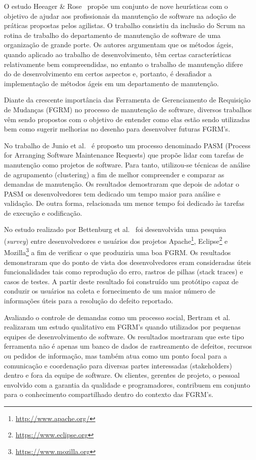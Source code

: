 O estudo Heeager \& Rose~\cite{Heeager2015} propõe um conjunto de nove heurísticas com o objetivo de ajudar aos profissionais da manutenção de software na adoção de práticas propostas pelos agilistas. O trabalho consistiu da inclusão do Scrum na rotina de trabalho do departamento de manutenção de software de uma organização de grande porte. Os autores argumentam que os métodos ágeis, quando aplicado ao trabalho de desenvolvimento, têm certas características relativamente bem compreendidas, no entanto o trabalho de manutenção difere do de desenvolvimento em certos aspectos e, portanto, é desafiador a implementação de métodos ágeis em um departamento de manutenção.

Diante da crescente importância das Ferramenta de Gerenciamento de Requisição de Mudanças (FGRM) no processo de manutenção de software, diversos trabalhos vêm sendo propostos com o objetivo de entender como elas estão sendo utilizadas bem como sugerir melhorias no desenho para desenvolver futuras FGRM's.

No trabalho de Junio et al.~\cite{5741246} é proposto um processo denominado PASM (Process for Arranging
Software Maintenance Requests) que propõe lidar com tarefas de manutenção como projetos de software. Para tanto, utilizou-se técnicas de análise de agrupamento (clustering) a fim de melhor compreender e comparar as demandas de manutenção. Os resultados demostraram que depois de adotar o PASM os
desenvolvedores tem dedicado um tempo maior para análise e validação. De outra forma, relacionada um menor tempo foi dedicado às tarefas de execução e codificação.

No estudo realizado por Bettenburg et al.~\cite{bettenburg2008makes} foi
desenvolvida uma pesquisa (\textit{survey}) entre desenvolvedores e usuários dos
projetos Apache\footnote{\url{http://www.apache.org/}}, Eclipse\footnote{\url{https://www.eclipse.org}} e Mozilla\footnote{\url{https://www.mozilla.org}} a fim de verificar o que
produziria uma boa FGRM\@. Os resultados demonstraram que do ponto de vista dos desenvolvedores eram consideradas úteis funcionalidades tais como reprodução do erro, rastros de pilhas (stack traces) e casos de testes. A partir deste resultado foi construído um protótipo capaz de conduzir os usuários na coleta e fornecimento de um maior número de informações úteis para a resolução do defeito reportado.

Avaliando o controle de demandas como um processo social, Bertram et
al.~\cite{Bertram:2010:CCB:1718918.1718972} realizaram um estudo qualitativo em
FGRM's quando utilizados por pequenas equipes de desenvolvimento de software. Os resultados mostraram que este tipo ferramenta não é apenas um banco de dados de rastreamento de defeitos, recursos ou pedidos de informação, mas também atua como um ponto focal para a comunicação e coordenação para diversas partes interessadas (stakeholders) dentro e fora da equipe de software. Os
clientes, gerentes de projeto, o pessoal envolvido com a garantia da qualidade
e programadores, contribuem em conjunto para o conhecimento compartilhado dentro do contexto das FGRM's.

